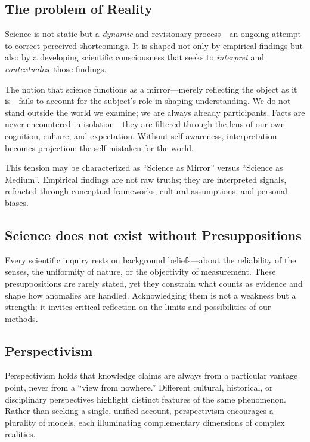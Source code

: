 \documentclass[a4paper]{article}
\begin{document}
\subsection{The problem of Reality}
Science is not static but a \textit{dynamic} and revisionary process—an ongoing attempt to correct perceived shortcomings.  
It is shaped not only by empirical findings but also by a developing scientific consciousness that seeks to \textit{interpret} and \textit{contextualize} those findings.

The notion that science functions as a mirror—merely reflecting the object as it is—fails to account for the subject’s role in shaping understanding.  
We do not stand outside the world we examine; we are always already participants.  
Facts are never encountered in isolation—they are filtered through the lens of our own cognition, culture, and expectation.  
Without self-awareness, interpretation becomes projection: the self mistaken for the world.

This tension may be characterized as \enquote{Science as Mirror} versus \enquote{Science as Medium}.  
Empirical findings are not raw truths; they are interpreted signals, refracted through conceptual frameworks, cultural assumptions, and personal biases.

\subsection{Science does not exist without Presuppositions}
Every scientific inquiry rests on background beliefs—about the reliability of the senses, the uniformity of nature, or the objectivity of measurement. 
These presuppositions are rarely stated, yet they constrain what counts as evidence and shape how anomalies are handled. 
Acknowledging them is not a weakness but a strength: it invites critical reflection on the limits and possibilities of our methods.

\subsection{Perspectivism}
Perspectivism holds that knowledge claims are always from a particular vantage point, never from a “view from nowhere.” 
Different cultural, historical, or disciplinary perspectives highlight distinct features of the same phenomenon. 
Rather than seeking a single, unified account, perspectivism encourages a plurality of models, each illuminating complementary dimensions of complex realities.
\end{document}

